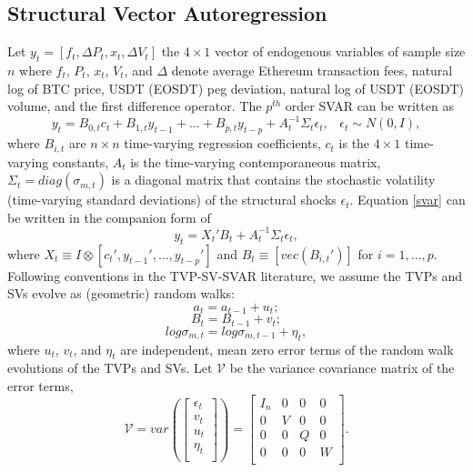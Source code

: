 \documentclass[12pt]{article}
\begin{document}
\subsection{Structural Vector Autoregression}
Let $y_t = [f_t, \Delta{P_t}, x_t, \Delta{V_t}]$ the $4\times1$ vector of endogenous variables of sample size $n$ where $f_t$, $P_t$, $x_t$, $V_t$, and $\Delta$ denote average Ethereum transaction fees, natural log of BTC price, USDT (EOSDT) peg deviation, natural log of USDT (EOSDT) volume, and the first difference operator. The $p^{th}$ order SVAR can be written as
\begin{equation}\label{svar}
y_t = B_{0,t}c_t + B_{1,t}y_{t-1} + ... + B_{p,t}y_{t-p} + A_t^{-1}\Sigma_t\epsilon_t, \,\,\,\,\, \epsilon_t\sim{N}(0,I),
\end{equation}
where $B_{i,t}$ are $n\times{n}$ time-varying regression coefficients, $c_t$ is the $4\times1$ time-varying constants, $A_t$ is the time-varying contemporaneous matrix, $\Sigma_t = diag(\sigma_{m,t})$ is a diagonal matrix that contains the stochastic volatility (time-varying standard deviations) of the structural shocks $\epsilon_t$. Equation \eqref{svar} can be written in the companion form of 
\begin{equation}
y_t = X_t'B_t + A_t^{-1}\Sigma_t\epsilon_t,
\end{equation}
where $X_t\equiv{I}\otimes[c_t', y_{t-1}', ... , y_{t-p}']$ and $B_t\equiv[vec(B_{i,t}')]$ for $i=1,... ,p$. 
Following conventions in the TVP-SV-SVAR literature, we assume the TVPs and SVs evolve as (geometric) random walks:
\begin{equation}
a_t = a_{t-1} + u_t;
\end{equation}
\begin{equation}
B_t = B_{t-1} + v_t;
\end{equation}
\begin{equation}
log\sigma_{m,t} = log\sigma_{m,t-1} + \eta_t,
\end{equation}
where $u_t$, $v_t$, and $\eta_t$ are independent, mean zero error terms of the random walk evolutions of the TVPs and SVs. Let $\mathcal{V}$ be the variance covariance matrix of the error terms,
\begin{equation}
\mathcal{V} = var(\begin{bmatrix}
\epsilon_t \\ v_t \\ u_t \\ \eta_t\\
\end{bmatrix})
=
 \begin{bmatrix}
I_n & 0 & 0 & 0\\
0   & V & 0 & 0 \\
0   & 0 & Q & 0\\
0   & 0 & 0 & W\\
\end{bmatrix}. 
\end{equation}
\end{document}
